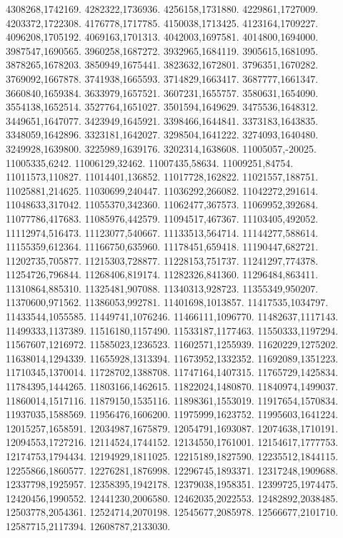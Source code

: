 4308268,1742169.
4282322,1736936.
4256158,1731880.
4229861,1727009.
4203372,1722308.
4176778,1717785.
4150038,1713425.
4123164,1709227.
4096208,1705192.
4069163,1701313.
4042003,1697581.
4014800,1694000.
3987547,1690565.
3960258,1687272.
3932965,1684119.
3905615,1681095.
3878265,1678203.
3850949,1675441.
3823632,1672801.
3796351,1670282.
3769092,1667878.
3741938,1665593.
3714829,1663417.
3687777,1661347.
3660840,1659384.
3633979,1657521.
3607231,1655757.
3580631,1654090.
3554138,1652514.
3527764,1651027.
3501594,1649629.
3475536,1648312.
3449651,1647077.
3423949,1645921.
3398466,1644841.
3373183,1643835.
3348059,1642896.
3323181,1642027.
3298504,1641222.
3274093,1640480.
3249928,1639800.
3225989,1639176.
3202314,1638608.
11005057,-20025.
11005335,6242.
11006129,32462.
11007435,58634.
11009251,84754.
11011573,110827.
11014401,136852.
11017728,162822.
11021557,188751.
11025881,214625.
11030699,240447.
11036292,266082.
11042272,291614.
11048633,317042.
11055370,342360.
11062477,367573.
11069952,392684.
11077786,417683.
11085976,442579.
11094517,467367.
11103405,492052.
11112974,516473.
11123077,540667.
11133513,564714.
11144277,588614.
11155359,612364.
11166750,635960.
11178451,659418.
11190447,682721.
11202735,705877.
11215303,728877.
11228153,751737.
11241297,774378.
11254726,796844.
11268406,819174.
11282326,841360.
11296484,863411.
11310864,885310.
11325481,907088.
11340313,928723.
11355349,950207.
11370600,971562.
11386053,992781.
11401698,1013857.
11417535,1034797.
11433544,1055585.
11449741,1076246.
11466111,1096770.
11482637,1117143.
11499333,1137389.
11516180,1157490.
11533187,1177463.
11550333,1197294.
11567607,1216972.
11585023,1236523.
11602571,1255939.
11620229,1275202.
11638014,1294339.
11655928,1313394.
11673952,1332352.
11692089,1351223.
11710345,1370014.
11728702,1388708.
11747164,1407315.
11765729,1425834.
11784395,1444265.
11803166,1462615.
11822024,1480870.
11840974,1499037.
11860014,1517116.
11879150,1535116.
11898361,1553019.
11917654,1570834.
11937035,1588569.
11956476,1606200.
11975999,1623752.
11995603,1641224.
12015257,1658591.
12034987,1675879.
12054791,1693087.
12074638,1710191.
12094553,1727216.
12114524,1744152.
12134550,1761001.
12154617,1777753.
12174753,1794434.
12194929,1811025.
12215189,1827590.
12235512,1844115.
12255866,1860577.
12276281,1876998.
12296745,1893371.
12317248,1909688.
12337798,1925957.
12358395,1942178.
12379038,1958351.
12399725,1974475.
12420456,1990552.
12441230,2006580.
12462035,2022553.
12482892,2038485.
12503778,2054361.
12524714,2070198.
12545677,2085978.
12566677,2101710.
12587715,2117394.
12608787,2133030.
